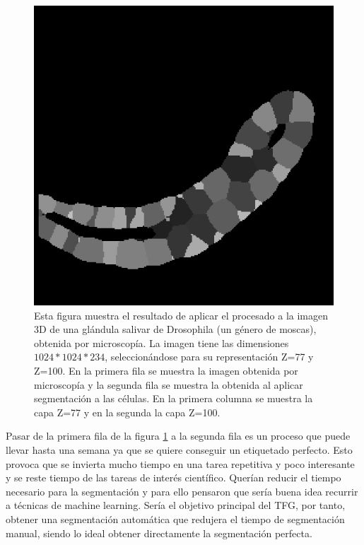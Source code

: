 \begin{figure}[ht]
\includegraphics[scale=0.18]{img/target 04_1a Z=100.png}
\caption[Segmentación de dos capas de una glándula salivar de Drosophila]{Esta figura muestra el resultado de aplicar el procesado a la imagen 3D de una glándula salivar de Drosophila (un género de moscas), obtenida por microscopía. La imagen tiene las dimensiones $1024*1024*234$, seleccionándose para su representación Z=77 y Z=100. En la primera fila se muestra la imagen obtenida por microscopía y la segunda fila se muestra la obtenida al aplicar segmentación a las células. En la primera columna se muestra la capa Z=77 y en la segunda la capa Z=100.}\bigskip
\label{fig:ejemplo1_segmentacion}
\end{figure}

Pasar de la primera fila de la figura \ref{fig:ejemplo1_segmentacion} a la segunda fila es un proceso que puede llevar hasta una semana ya que se quiere conseguir un etiquetado perfecto. Esto provoca que se invierta mucho tiempo en una tarea repetitiva y poco interesante y se reste tiempo de las tareas de interés científico. Querían reducir el tiempo necesario para la segmentación y para ello pensaron que sería buena idea recurrir a técnicas de machine learning. Sería el objetivo principal del TFG, por tanto, obtener una segmentación automática que redujera el tiempo de segmentación manual, siendo lo ideal obtener directamente la segmentación perfecta.